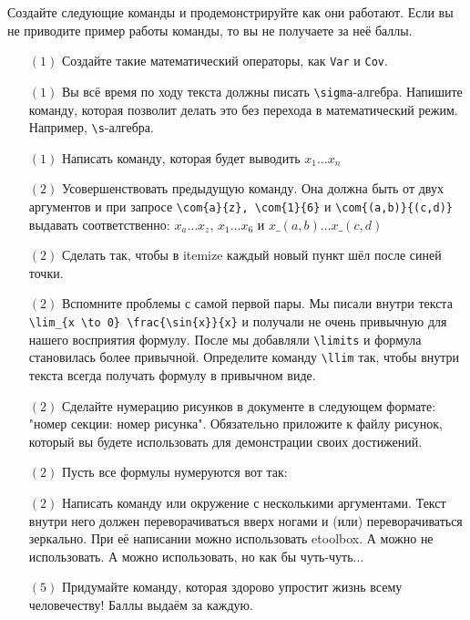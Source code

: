 \documentclass[12pt, a4paper, oneside]{article}
\begin{document}
Создайте следующие команды и продемонстрируйте как они работают. Если вы не приводите пример работы команды, то вы не получаете за неё баллы.

\begin{itemize}
	\item[$(1)$] Создайте такие математический операторы, как \verb|Var| и \verb|Cov|.
	\item[$(1)$] Вы всё время по ходу текста должны писать \verb|\sigma|-алгебра. Напишите команду, которая позволит делать это без перехода в математический режим. Например,  \verb|\s|-алгебра.
	\item[$(1)$] Написать команду, которая будет выводить $x_1 \ldots x_n$
	\item[$(2)$] Усовершенствовать предыдущую команду. Она должна быть от двух аргументов и при запросе \verb|\com{a}{z}, \com{1}{6}| и \verb|\com{(a,b)}{(c,d)}| выдавать соответственно:  $x_a \ldots x_z$, 
	$x_1 \ldots x_6$ и   $x\_{(a,b)} \ldots x\_{(c,d)}$
	\item[$(2)$] Сделать так, чтобы в itemize каждый новый пункт шёл после синей точки.
	
	
	
	
	\item[$(2)$] Вспомните проблемы с самой первой пары. Мы писали внутри текста \verb|\lim_{x \to 0} \frac{\sin{x}}{x}| и получали не очень привычную для нашего восприятия формулу. После мы добавляли \verb|\limits| и формула становилась более привычной. Определите команду \verb|\llim| так, чтобы внутри текста всегда получать формулу в привычном виде.
	\item[$(2)$] Сделайте нумерацию рисунков в документе в следующем формате: "номер секции: номер рисунка". Обязательно приложите к файлу рисунок, который вы будете использовать для демонстрации своих достижений.
	\item[$(2)$] Пусть все формулы нумеруются вот так: 
	
	
	\item[$(2)$] Написать команду или окружение с несколькими аргументами. Текст внутри него должен переворачиваться вверх ногами и (или) переворачиваться зеркально. При её написании можно использовать etoolbox. А можно не использовать. А можно использовать, но как бы чуть-чуть...
	\item[$(5)$] Придумайте команду, которая здорово упростит жизнь всему человечеству! Баллы выдаём за каждую. 
\end{itemize}
\end{document}
